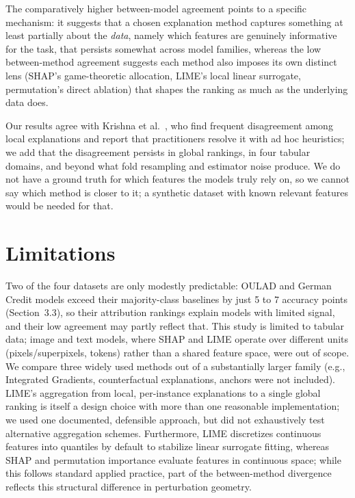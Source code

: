 \documentclass[11pt,twoside,a4paper]{article}
\begin{document}
The comparatively higher between-model agreement points to a specific mechanism: it suggests that a chosen explanation method captures something at least partially about the \emph{data}, namely which features are genuinely informative for the task, that persists somewhat across model families, whereas the low between-method agreement suggests each method also imposes its own distinct lens (SHAP's game-theoretic allocation, LIME's local linear surrogate, permutation's direct ablation) that shapes the ranking as much as the underlying data does.

Our results agree with Krishna et al.~\citep{krishna2024disagreement}, who find frequent disagreement among local explanations and report that practitioners resolve it with ad hoc heuristics; we add that the disagreement persists in global rankings, in four tabular domains, and beyond what fold resampling and estimator noise produce. We do not have a ground truth for which features the models truly rely on, so we cannot say which method is closer to it; a synthetic dataset with known relevant features would be needed for that.

\section{Limitations}

Two of the four datasets are only modestly predictable: OULAD and German Credit models exceed their majority-class baselines by just 5 to 7 accuracy points (Section~3.3), so their attribution rankings explain models with limited signal, and their low agreement may partly reflect that. This study is limited to tabular data; image and text models, where SHAP and LIME operate over different units (pixels/superpixels, tokens) rather than a shared feature space, were out of scope. We compare three widely used methods out of a substantially larger family (e.g., Integrated Gradients, counterfactual explanations, anchors were not included). LIME's aggregation from local, per-instance explanations to a single global ranking is itself a design choice with more than one reasonable implementation; we used one documented, defensible approach, but did not exhaustively test alternative aggregation schemes. Furthermore, LIME discretizes continuous features into quantiles by default to stabilize linear surrogate fitting, whereas SHAP and permutation importance evaluate features in continuous space; while this follows standard applied practice, part of the between-method divergence reflects this structural difference in perturbation geometry.
\end{document}

